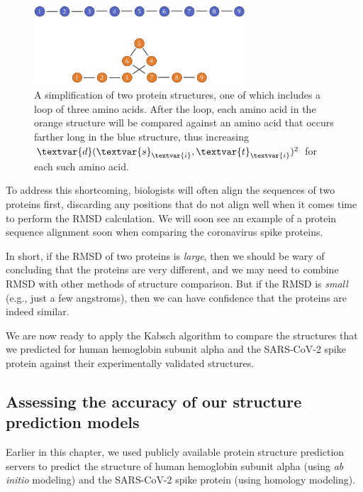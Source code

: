 \begin{figure}[h]
	\centering
	\mySfFamily
	\includegraphics[width = 0.7\textwidth]{../images/RMSD_weakness_loop.png}
	\caption{A simplification of two protein structures, one of which includes a loop of three amino acids. After the loop, each amino acid in the orange structure will be compared against an amino acid that occurs farther long in the blue structure, thus increasing $\textvar{d}(\textvar{s}_{\textvar{i}}, \textvar{t}_{\textvar{i}})^\text{2}$ for each such amino acid.}
	\label{fig:RMSD_weakness_loop}
\end{figure}

To address this shortcoming, biologists will often align the sequences of two proteins first, discarding any positions that do not align well when it comes time to perform the RMSD calculation. We will soon see an example of a protein sequence alignment soon when comparing the coronavirus spike proteins.

In short, if the RMSD of two proteins is \textit{large}, then we should be wary of concluding that the proteins are very different, and we may need to combine RMSD with other methods of structure comparison. But if the RMSD is \textit{small} (e.g., just a few angstroms), then we can have confidence that the proteins are indeed similar.

We are now ready to apply the Kabsch algorithm to compare the structures that we predicted for human hemoglobin subunit alpha and the SARS-CoV-2 spike protein against their experimentally validated structures. 

\FloatBarrier
{}
\subsection{Assessing the accuracy of our structure prediction models}

Earlier in this chapter, we used publicly available protein structure prediction servers to predict the structure of human hemoglobin subunit alpha (using \textit{ab initio} modeling) and the SARS-CoV-2 spike protein (using homology modeling).

